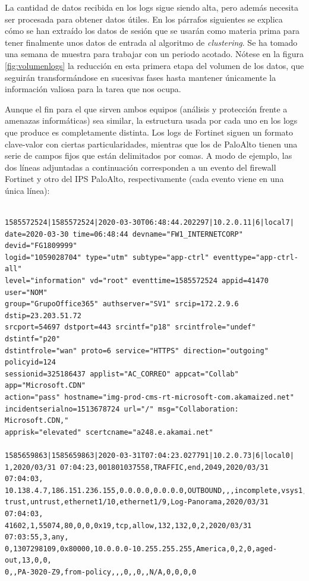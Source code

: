 La cantidad de datos recibida en los logs sigue siendo alta, pero además necesita ser procesada para obtener datos útiles.
En los párrafos siguientes se explica cómo se han extraído los datos de sesión que se usarán como materia prima para tener finalmente unos datos de entrada al algoritmo de \emph{clustering}.
Se ha tomado una semana de muestra para trabajar con un periodo acotado.
Nótese en la figura \ref{fig:volumenlogs} la reducción en esta primera etapa del volumen de los datos, que seguirán transformándose en sucesivas fases hasta mantener únicamente la información valiosa para la tarea que nos ocupa.

Aunque el fin para el que sirven ambos equipos (análisis y protección frente a amenazas informáticas) sea similar,
la estructura usada por cada uno en los logs que produce es completamente distinta.
Los logs de Fortinet siguen un formato clave-valor con ciertas particularidades, mientras que los de PaloAlto tienen una serie de campos fijos que están delimitados por comas.
A modo de ejemplo, las dos líneas adjuntadas a continuación corresponden a un evento del firewall Fortinet y otro del IPS PaloAlto, respectivamente (cada evento viene en una única línea):

\begingroup
\makeatletter
\@totalleftmargin=-1cm
\begin{verbatim}

1585572524|1585572524|2020-03-30T06:48:44.202297|10.2.0.11|6|local7|
date=2020-03-30 time=06:48:44 devname="FW1_INTERNETCORP" devid="FG1809999"
logid="1059028704" type="utm" subtype="app-ctrl" eventtype="app-ctrl-all"
level="information" vd="root" eventtime=1585572524 appid=41470 user="NOM"
group="GrupoOffice365" authserver="SV1" srcip=172.2.9.6 dstip=23.203.51.72
srcport=54697 dstport=443 srcintf="p18" srcintfrole="undef" dstintf="p20"
dstintfrole="wan" proto=6 service="HTTPS" direction="outgoing" policyid=124
sessionid=325186437 applist="AC_CORREO" appcat="Collab" app="Microsoft.CDN"
action="pass" hostname="img-prod-cms-rt-microsoft-com.akamaized.net"
incidentserialno=1513678724 url="/" msg="Collaboration: Microsoft.CDN,"
apprisk="elevated" scertcname="a248.e.akamai.net"

1585659863|1585659863|2020-03-31T07:04:23.027791|10.2.0.73|6|local0|
1,2020/03/31 07:04:23,001801037558,TRAFFIC,end,2049,2020/03/31 07:04:03,
10.138.4.7,186.151.236.155,0.0.0.0,0.0.0.0,OUTBOUND,,,incomplete,vsys1,
trust,untrust,ethernet1/10,ethernet1/9,Log-Panorama,2020/03/31 07:04:03,
41602,1,55074,80,0,0,0x19,tcp,allow,132,132,0,2,2020/03/31 07:03:55,3,any,
0,1307298109,0x80000,10.0.0.0-10.255.255.255,America,0,2,0,aged-out,13,0,0,
0,,PA-3020-Z9,from-policy,,,0,,0,,N/A,0,0,0,0

\end{verbatim}
\endgroup

